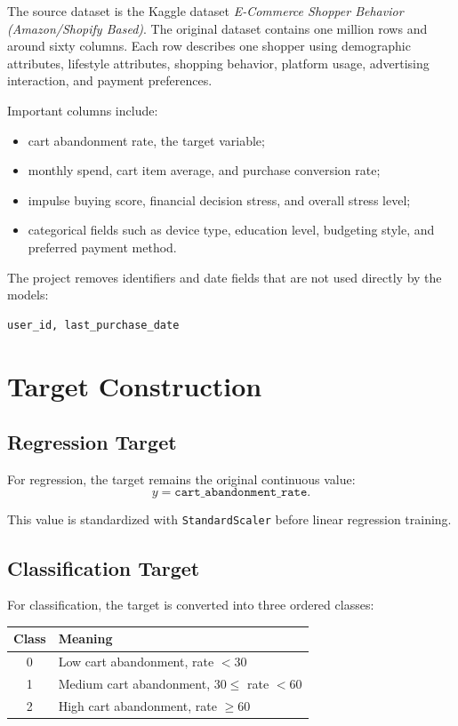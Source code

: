 \documentclass[11pt,a4paper]{article}
\begin{document}
The source dataset is the Kaggle dataset \textit{E-Commerce Shopper Behavior (Amazon/Shopify Based)}. The original dataset contains one million rows and around sixty columns. Each row describes one shopper using demographic attributes, lifestyle attributes, shopping behavior, platform usage, advertising interaction, and payment preferences.

Important columns include:
\begin{itemize}
  \item cart abandonment rate, the target variable;
  \item monthly spend, cart item average, and purchase conversion rate;
  \item impulse buying score, financial decision stress, and overall stress level;
  \item categorical fields such as device type, education level, budgeting style, and preferred payment method.
\end{itemize}

The project removes identifiers and date fields that are not used directly by the models:
\begin{verbatim}
user_id, last_purchase_date
\end{verbatim}

\section{Target Construction}

\subsection{Regression Target}

For regression, the target remains the original continuous value:
\[
y = \texttt{cart\_abandonment\_rate}.
\]

This value is standardized with \texttt{StandardScaler} before linear regression training.

\subsection{Classification Target}

For classification, the target is converted into three ordered classes:
\begin{center}
\begin{tabular}{cl}
\toprule
Class & Meaning \\
\midrule
0 & Low cart abandonment, rate $< 30$ \\
1 & Medium cart abandonment, $30 \leq$ rate $< 60$ \\
2 & High cart abandonment, rate $\geq 60$ \\
\bottomrule
\end{tabular}
\end{center}
\end{document}
